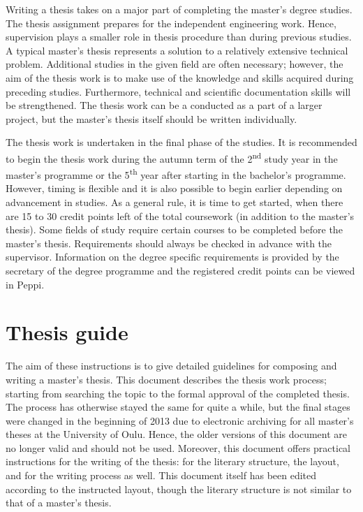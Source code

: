 Writing a thesis takes on a major part of completing the master’s degree studies. The thesis assignment prepares for the independent engineering work. Hence, supervision plays a smaller role in thesis procedure than during previous studies. A typical master’s thesis represents a solution to a relatively extensive technical problem. Additional studies in the given field are often necessary; however, the aim of the thesis work is to make use of the knowledge and skills acquired during preceding studies. Furthermore, technical and scientific documentation skills will be strengthened. The thesis work can be a conducted as a part of a larger project, but the master’s thesis itself should be written individually.

The thesis work is undertaken in the final phase of the studies. It is recommended to begin the thesis work during the autumn term of the 2\textsuperscript{nd} study year in the master’s programme or the 5\textsuperscript{th} year after starting in the bachelor’s programme. However, timing is flexible and it is also possible to begin earlier depending on advancement in studies. As a general rule, it is time to get started, when there are 15 to 30 credit points left of the total coursework (in addition to the master’s thesis). Some fields of study require certain courses to be completed before the master’s thesis. Requirements should always be checked in advance with the supervisor. Information on the degree specific requirements is provided by the secretary of the degree programme and the registered credit points can be viewed in Peppi.

\section{Thesis guide}
The aim of these instructions is to give detailed guidelines for composing and writing a master’s thesis. This document describes the thesis work process; starting from searching the topic to the formal approval of the completed thesis. The process has otherwise stayed the same for quite a while, but the final stages were changed in the beginning of 2013 due to electronic archiving for all master’s theses at the University of Oulu. Hence, the older versions of this document are no longer valid and should not be used. Moreover, this document offers practical instructions for the writing of the thesis: for the literary structure, the layout, and for the writing process as well. This document itself has been edited according to the instructed layout, though the literary structure is not similar to that of a master’s thesis.

